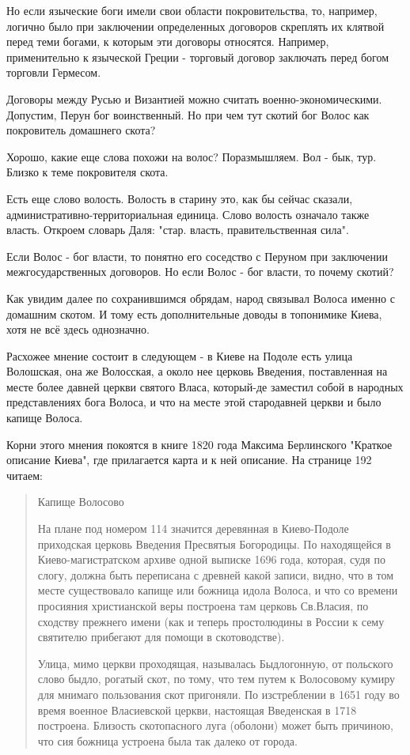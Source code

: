 \documentclass[a5paper,11pt,openany]{article}
\begin{document}
   Но если языческие боги имели свои области покровительства, то, например, логично было при заключении определенных договоров скреплять их клятвой перед теми богами, к которым эти договоры относятся. Например, применительно к языческой Греции - торговый договор заключать перед богом торговли Гермесом.

   Договоры между Русью и Византией можно считать военно-экономическими. Допустим, Перун бог воинственный. Но при чем тут скотий бог Волос как покровитель 
домашнего скота?

   Хорошо, какие еще слова похожи на волос? Поразмышляем. Вол - бык, тур. Близко к теме покровителя скота.

   Есть еще слово волость. Волость в старину это, как бы сейчас сказали, административно-территориальная единица. Слово волость означало также власть. Откроем словарь Даля: "стар. власть, правительственная сила".

   Если Волос - бог власти, то понятно его соседство с Перуном при заключении межгосударственных договоров. Но если Волос - бог власти, то почему скотий?

   Как увидим далее по сохранившимся обрядам, народ связывал Волоса именно с домашним скотом. И тому есть дополнительные доводы в топонимике Киева, хотя не всё здесь однозначно.

   Расхожее мнение состоит в следующем - в Киеве на Подоле есть улица Волошская, она же Волосская, а около нее церковь Введения, поставленная на месте более давней церкви святого Власа, который-де заместил собой в народных представлениях бога Волоса, и что на месте этой стародавней церкви и было капище Волоса.

   Корни этого мнения покоятся в книге 1820 года Максима Берлинского "Краткое описание Киева", где прилагается карта и к ней описание. На странице 192 читаем:

\begin{quotation}
Капище Волосово

На плане под номером 114 значится деревянная в Киево-Подоле приходская церковь Введения Пресвятыя Богородицы.
По находящейся в Киево-магистратском архиве одной выписке 1696 года, которая, судя по слогу, должна быть переписана с древней какой записи, видно, что в том месте существовало капище или божница идола Волоса, и что со времени просияния христианской веры построена там церковь Св.Власия, по сходству прежнего имени (как и теперь простолюдины в России к сему святителю прибегают для помощи в скотоводстве).

  Улица, мимо церкви проходящая, называлась Быдлогонную, от польского слово быдло, рогатый скот, по тому, что тем путем к Волосовому кумиру для мнимаго пользования скот пригоняли.
   По изстреблении в 1651 году во время военное Власиевской церкви, настоящая Введенская в 1718 построена. Близость скотопасного луга (оболони) может быть причиною, что сия божница устроена была так далеко от города.
\end{quotation}
\end{document}
